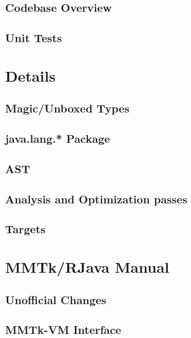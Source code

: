 \documentclass[12pt]{article}
\begin{document}
\subsection{Codebase Overview}
\subsection{Unit Tests}

\section{\rjcfull Details}

\subsection{Magic/Unboxed Types}
\subsection{java.lang.* Package}
\subsection{\rjcfull AST}
\subsection{Analysis and Optimization passes}
\subsection{\rjcfull Targets}

\section{MMTk/RJava Manual}

\subsection{Unofficial Changes}
\subsection{MMTk-VM Interface}
\end{document}
